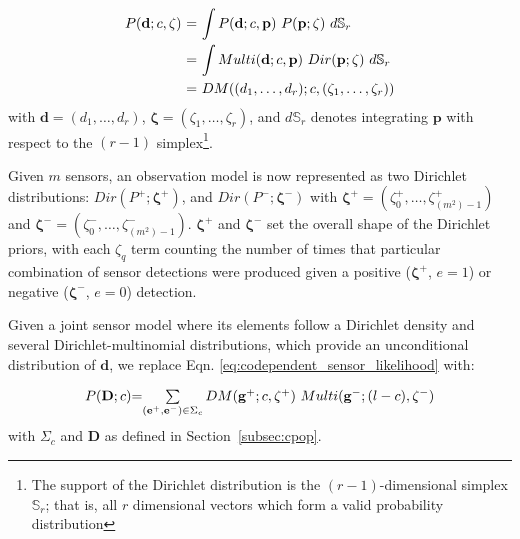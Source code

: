 \begin{equation}
	\label{eq:beta_binomial_revisit}
	\begin{tabular}{r@{ = }l}
        $P(\mathbf{d} ; c, \mathbf{\zeta})$ & $\displaystyle\int P(\mathbf{d} ; c, \mathbf{p}) ~ P(\mathbf{p} ; \mathbf{\zeta}) ~d\mathbb S_r$ \\ [2ex]
        & $\displaystyle\int Multi(\mathbf{d} ; c, \mathbf{p}) ~ Dir(\mathbf{p} ; \mathbf{\zeta}) ~d\mathbb S_r$ \\ [2ex]
        & $DM((d_1, \ldots, d_r) ; c, (\zeta_1, \ldots, \zeta_r))$
	\end{tabular}
\end{equation}
\noindent with $\mathbf{d} = (d_1, \ldots, d_r)$, $\mathbf{\zeta} = (\zeta_1, \ldots, \zeta_r)$, and $d\mathbb S_r$ denotes integrating $\mathbf{p}$ with respect to the $(r - 1)$ simplex\footnote{The support of the Dirichlet distribution is the $(r - 1)$-dimensional simplex $\mathbb S_r$; that is, all $r$ dimensional vectors which form a valid probability distribution}.

Given $m$ sensors, an observation model is now represented as two Dirichlet distributions: $Dir(P^+ ; \mathbf{\zeta^+})$, and $Dir(P^- ; \mathbf{\zeta^-})$ with $\mathbf{\zeta^+} = (\zeta^+_0, \ldots, \zeta^+_{(m^2)-1})$ and $\mathbf{\zeta^-} = (\zeta^-_0, \ldots, \zeta^-_{(m^2)-1})$. $\mathbf{\zeta^+}$ and $\mathbf{\zeta^-}$ set the overall shape of the Dirichlet priors, with each $\zeta_q$ term counting the number of times that particular combination of sensor detections were produced given a positive ($\mathbf{\zeta^+}$, $e=1$) or negative ($\mathbf{\zeta^-}$, $e=0$) detection.


Given a joint sensor model where its elements follow a Dirichlet density and several Dirichlet-multinomial distributions, which provide an unconditional distribution of $\mathbf{d}$, we replace Eqn. \ref{eq:codependent_sensor_likelihood} with:  

\begin{equation}
	\label{eq:joint_dirichlet_multinomial_distribution}
    \begin{tabular}{r@{=}l}
		$P(\mathbf{D} ; c)$ & $\sum\limits_{(\mathbf{e}^+, \mathbf{e}^-) \in \Sigma_c} DM(\mathbf{g}^+ ; c, \mathbf{\zeta^+}) ~ Multi(\mathbf{g}^- ; (l - c), \mathbf{\zeta^-})$
	\end{tabular}
\end{equation}
\noindent with $\Sigma_c$ and $\mathbf{D}$ as defined in Section~\ref{subsec:cpop}.

